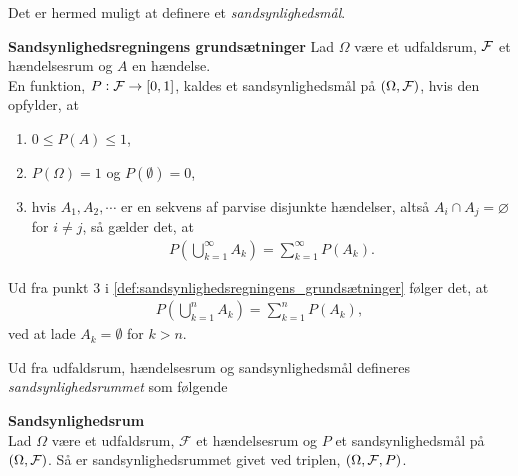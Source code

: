 Det er hermed muligt at definere et \textit{sandsynlighedsmål}.

\begin{defn}\textbf{Sandsynlighedsregningens grundsætninger} \label{def:sandsynlighedsregningens_grundsætninger}%
\newline
Lad $\Omega$ være et udfaldsrum, $\mathcal{F}$ et hændelsesrum og $A$ en hændelse.\\
En funktion, $P: \mathcal{F} \to [0,1]$, kaldes et sandsynlighedsmål på $(\Omega, \mathcal{F})$, hvis den opfylder, at
\begin{enumerate}
    \item $0 \leq P(A) \leq 1$,
    \item $P(\Omega) = 1$ og $P(\emptyset)=0$,
    \item hvis $A_1, A_2, \cdots $ er en sekvens af parvise disjunkte hændelser, altså $A_i \cap A_j = \varnothing$ for $i \neq j$, så gælder det, at
    \begin{align*}
        P\left(\bigcup_{k=1}^\infty A_k \right) = \sum_{k=1}^\infty P(A_k).
    \end{align*}
\end{enumerate}

\end{defn}
Ud fra punkt 3 i \autoref{def:sandsynlighedsregningens_grundsætninger} følger det, at
\begin{align*}
    P\left(\bigcup_{k=1}^n A_k \right) = \sum_{k=1}^n P(A_k),
\end{align*}
ved at lade $A_k = \emptyset$ for $k > n$.

Ud fra udfaldsrum, hændelsesrum og sandsynlighedsmål defineres \textit{sandsynlighedsrummet} som følgende

\begin{minipage}\textwidth
\begin{defn}\textbf{Sandsynlighedsrum}\\
    Lad $\Omega$ være et udfaldsrum, $\mathcal{F}$ et hændelsesrum og $P$ et sandsynlighedsmål på $(\Omega, \mathcal{F})$. Så er sandsynlighedsrummet givet ved triplen, $(\Omega, \mathcal{F}, P)$. 
\end{defn}
\end{minipage}



